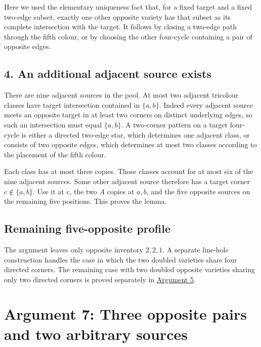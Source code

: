 \documentclass[
  10pt,
]{article}
\begin{document}
Here we used the elementary uniqueness fact that, for a fixed target and
a fixed two-edge subset, exactly one other opposite variety has that
subset as its complete intersection with the target. It follows by
closing a two-edge path through the fifth colour, or by choosing the
other four-cycle containing a pair of opposite edges.

\hypertarget{an-additional-adjacent-source-exists}{%
\subsection*{4. An additional adjacent source
exists}\label{an-additional-adjacent-source-exists}}

There are nine adjacent sources in the pool. At most two adjacent
tricolour classes have target intersection contained in \(\{a,b\}\).
Indeed every adjacent source meets an opposite target in at least two
corners on distinct underlying edges, so such an intersection must equal
\(\{a,b\}\). A two-corner pattern on a target four-cycle is either a
directed two-edge star, which determines one adjacent class, or consists
of two opposite edges, which determines at most two classes according to
the placement of the fifth colour.

Each class has at most three copies. Those classes account for at most
six of the nine adjacent sources. Some other adjacent source therefore
has a target corner \(c\notin\{a,b\}\). Use it at \(c\), the two \(A\)
copies at \(a,b\), and the five opposite sources on the remaining five
positions. This proves the lemma.

\hypertarget{remaining-five-opposite-profile}{%
\subsection*{Remaining five-opposite
profile}\label{remaining-five-opposite-profile}}

The argument leaves only opposite inventory \(2,2,1\). A separate
line-hole construction handles the case in which the two doubled
varieties share four directed corners. The remaining case with two
doubled opposite varieties sharing only two directed corners is proved
separately in \protect\hyperlink{arg-5}{Argument 5}.

\hypertarget{arg-7}{%
\section{Argument 7: Three opposite pairs and two arbitrary
sources}\label{arg-7}}
\end{document}
